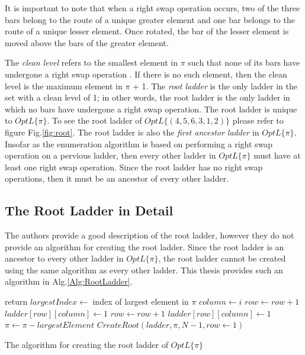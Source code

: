It is important to note that when a right swap operation occurs, 
two of the three bars belong to the route of a unique greater element and one bar belongs
to the route of a unique lesser element. Once rotated, the bar of the lesser element is 
moved above the bars of the greater element.\par
The \emph{clean level} refers to the smallest element 
in $\pi$ such that none of its bars have undergone a right swap operation \cite{A1}.
If there is no such element, then the clean level is the maximum element in $\pi$ + 1.
The \emph{root ladder} is the only ladder in  the set with a clean level of 1; in 
other words, the root ladder is the only ladder in which no bars have undergone 
a right swap operation. The root ladder is unique to $OptL\{\pi\}$. To see the root ladder 
of $OptL\{(4,5,6,3,1,2)\}$ please refer to figure Fig.\ref{fig:root}. The root ladder is
also the \emph{first ancestor  ladder} in $OptL\{\pi\}$. Insofar as the enumeration algorithm 
is based on performing a right swap operation on a pervious ladder, then every other 
ladder in $OptL\{\pi\}$ must have at least one right swap operation. Since the root ladder has
no right swap operations, then it must be an ancestor of every other ladder.\par

\subsection{The Root Ladder in Detail}
The authors provide a good description of the root ladder, however they do not provide an algorithm 
for creating the root ladder. Since the root ladder is an ancestor to every other ladder in $OptL\{\pi\}$, 
the root ladder cannot be created using the same algorithm as every other ladder. This thesis provides such 
an algorithm in Alg.\ref{Alg:RootLadder}.\par

\begin{algorithm}
	\begin{algorithmic}[1]
				\State return
			\EndIf
			\State $largestIndex \gets$ index of largest element in $\pi$
					\State $column \gets i$
							\State $row \gets row+1$
						\EndWhile
						\State $ladder[row][column] \gets 1$
					\Else 
						\State $row \gets row+1$
						\State $ladder[row][column] \gets 1$
					\EndIf
				\EndIf
			\EndFor
			\State $\pi \gets \pi - largestElement$
			\State $CreateRoot(ladder, \pi, N-1, row \gets 1)$
		\EndFunction

	\end{algorithmic}
	\caption{The algorithm for creating the root ladder of $OptL\{\pi\}$}
	\label{Alg:RootLadder}
\end{algorithm}\pagebreak



